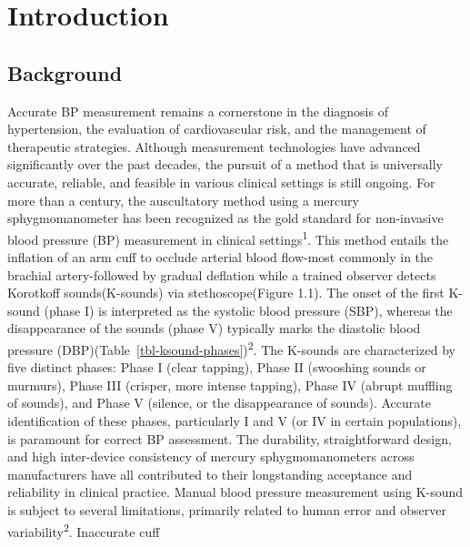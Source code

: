 \documentclass[
  12pt,
  letterpaper,
  openany,
  oneside]{book}
\let\realmainmatter\mainmatter
\renewcommand{\mainmatter}{}
\begin{document}
{}
\listoftables
\cleardoublepage

\realmainmatter
{}
\setcounter{page}{1}


\chapter{Introduction}\label{introduction}

\section{Background}\label{background}

Accurate BP measurement remains a cornerstone in the diagnosis of
hypertension, the evaluation of cardiovascular risk, and the management
of therapeutic strategies. Although measurement technologies have
advanced significantly over the past decades, the pursuit of a method
that is universally accurate, reliable, and feasible in various clinical
settings is still ongoing. For more than a century, the auscultatory
method using a mercury sphygmomanometer has been recognized as the gold
standard for non-invasive blood pressure (BP) measurement in clinical
settings\textsuperscript{1}. This method entails the inflation of an arm
cuff to occlude arterial blood flow-most commonly in the brachial
artery-followed by gradual deflation while a trained observer detects
Korotkoff sounds(K-sounds) via stethoscope(Figure 1.1). The onset of the
first K-sound (phase I) is interpreted as the systolic blood pressure
(SBP), whereas the disappearance of the sounds (phase V) typically marks
the diastolic blood pressure
(DBP)(Table~\ref{tbl-ksound-phases})\textsuperscript{2}. The K-sounds
are characterized by five distinct phases: Phase I (clear tapping),
Phase II (swooshing sounds or murmurs), Phase III (crisper, more intense
tapping), Phase IV (abrupt muffling of sounds), and Phase V (silence, or
the disappearance of sounds). Accurate identification of these phases,
particularly I and V (or IV in certain populations), is paramount for
correct BP assessment. The durability, straightforward design, and high
inter-device consistency of mercury sphygmomanometers across
manufacturers have all contributed to their longstanding acceptance and
reliability in clinical practice. Manual blood pressure measurement
using K-sound is subject to several limitations, primarily related to
human error and observer variability\textsuperscript{2}. Inaccurate cuff
\end{document}

